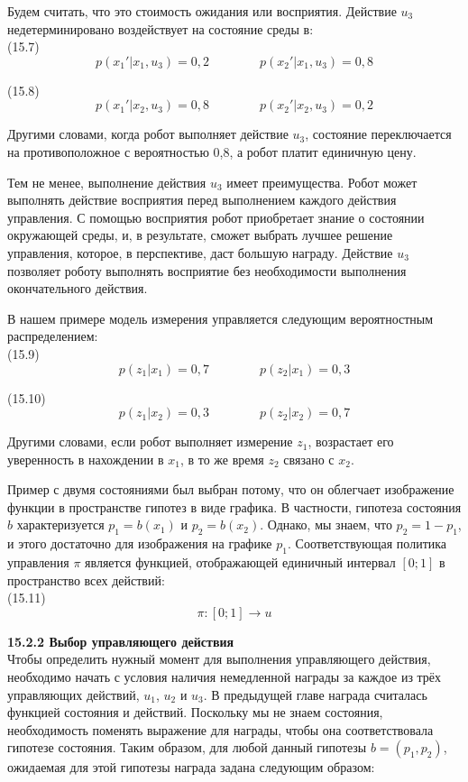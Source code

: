 \documentclass[10pt,a4paper]{article}
\begin{document}
Будем считать, что это стоимость ожидания или восприятия. Действие $u_3$ недетерминировано воздействует на состояние среды в:\\

(15.7)
$$p(x_1'|x_1,u_3)=0,2\qquad\qquad p(x_2'|x_1,u_3)=0,8$$

(15.8)
$$p(x_1'|x_2,u_3)=0,8\qquad\qquad p(x_2'|x_2,u_3)=0,2$$

Другими словами, когда робот выполняет действие $u_3$, состояние переключается на противоположное с вероятностью 0,8, а робот платит единичную цену.

Тем не менее, выполнение действия $u_3$ имеет преимущества. Робот может выполнять действие восприятия перед выполнением каждого действия управления. С помощью восприятия робот приобретает знание о состоянии окружающей среды, и, в результате, сможет выбрать лучшее решение управления, которое, в перспективе, даст большую награду. Действие $u_3$ позволяет роботу выполнять восприятие без необходимости выполнения окончательного действия.

В нашем примере модель измерения управляется следующим вероятностным распределением:\\

(15.9)
$$p(z_1|x_1)=0,7\qquad\qquad p(z_2|x_1)=0,3$$

(15.10)
$$p(z_1|x_2)=0,3\qquad\qquad p(z_2|x_2)=0,7$$

Другими словами, если робот выполняет измерение $z_1$, возрастает его уверенность в нахождении в $x_1$, в то же время $z_2$ связано с $x_2$.

Пример с двумя состояниями был выбран потому, что он облегчает изображение функции в пространстве гипотез в виде графика. В частности, гипотеза состояния $b$ характеризуется $p_1 = b(x_1)$ и $p_2 = b(x_2)$. Однако, мы знаем, что $p_2 = 1-p_1$, и этого достаточно для изображения на графике $p_1$. Соответствующая политика управления $\pi$ является функцией, отображающей единичный интервал $[0; 1]$ в пространство всех действий:\\

(15.11)
$$\pi:[0;1]\longrightarrow u$$

\textbf{15.2.2	Выбор управляющего действия}\\

Чтобы определить нужный момент для выполнения управляющего действия, необходимо начать с условия наличия немедленной награды за каждое из трёх управляющих действий, $u_1$, $u_2$ и $u_3$. В предыдущей главе награда считалась функцией состояния и действий.  Поскольку мы не знаем состояния, необходимость поменять выражение для награды, чтобы она соответствовала гипотезе состояния. Таким образом, для любой данный гипотезы $b = (p_1, p_2)$, ожидаемая для этой гипотезы награда задана следующим образом:\\
\end{document}
